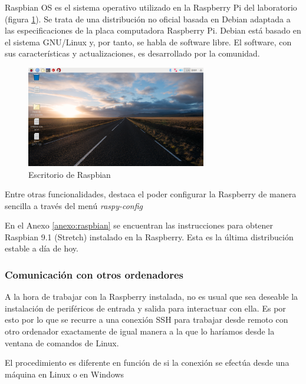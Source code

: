 Raspbian OS es el sistema operativo utilizado en la Raspberry Pi del laboratorio (figura \ref{fig:raspbian}). Se trata de una distribución no oficial basada en Debian adaptada a las especificaciones de la placa computadora Raspberry Pi. Debian está basado en el sistema GNU/Linux y, por tanto, se habla de software libre. El software, con sus características y actualizaciones, es desarrollado por la comunidad.

\begin{figure}[tb]
\centering
\includegraphics[width=0.7\textwidth]{figuras/Raspbian.png}
\caption{Escritorio de Raspbian}
\label{fig:raspbian}
\end{figure}

Entre otras funcionalidades, destaca el poder configurar la Raspberry de manera sencilla a través del menú \textit{raspy-config}

En el Anexo \ref{anexo:raspbian} se encuentran las instrucciones para obtener Raspbian 9.1 (Stretch) instalado en la Raspberry. Esta es la última distribución estable a día de hoy.

\subsubsection{Comunicación con otros ordenadores}


A la hora de trabajar con la Raspberry instalada, no es usual que sea deseable la instalación de periféricos de entrada y salida para interactuar con ella. Es por esto por lo que se recurre a una conexión SSH para trabajar desde remoto con otro ordenador exactamente de igual manera a la que lo haríamos desde la ventana de comandos de Linux.

El procedimiento es diferente en función de si la conexión se efectúa desde una máquina en Linux o en Windows

